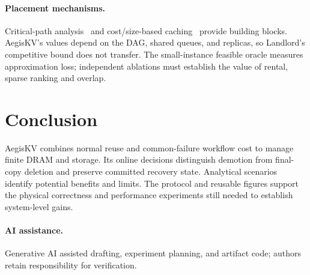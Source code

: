 \documentclass[sigplan,10pt,anonymous,nonacm]{acmart}
\begin{document}
\paragraph{Placement mechanisms.}
Critical-path analysis~\cite{kelley1959cpm} and cost/size-based caching~\cite{young2002landlord}
provide building blocks. AegisKV's values depend on the DAG, shared queues,
and replicas, so Landlord's competitive bound does not transfer. The
small-instance feasible oracle measures approximation loss; independent
ablations must establish the value of rental, sparse ranking and overlap.

\section{Conclusion}
\label{sec:conclusion}

AegisKV combines normal reuse and common-failure workflow cost to manage
finite DRAM and storage. Its online decisions distinguish demotion from
final-copy deletion and preserve committed recovery state. Analytical
scenarios identify potential benefits and limits. The protocol and
reusable figures support the physical correctness and performance
experiments still needed to establish system-level gains.

\paragraph{AI assistance.}
Generative AI assisted drafting, experiment planning, and artifact code;
authors retain responsibility for verification.



\end{document}
